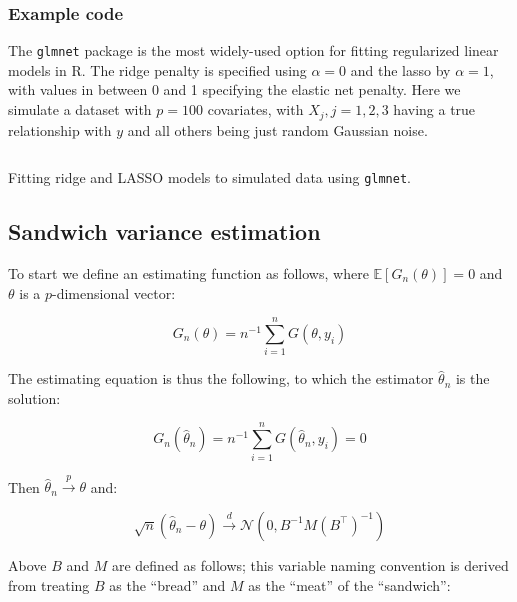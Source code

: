 \documentclass{report}
\begin{document}
\subsubsection{Example code}

The \texttt{glmnet} package is the most widely-used option for fitting regularized linear models in R. The ridge penalty is specified using $\alpha = 0$ and the \gls{lasso} by $\alpha = 1$, with values in between 0 and 1 specifying the elastic net penalty. Here we simulate a dataset with $p = 100$ covariates, with $X_j, j = 1, 2, 3$ having a true relationship with $y$ and all others being just random Gaussian noise. 

\begin{listing}[h!]
\inputminted{r}{Example-Code/ridge_and_lasso_gaussian.R}
\caption{Fitting ridge and LASSO models to simulated data using \texttt{glmnet}.}
\label{listing:glmnet-example}
\end{listing}

\subsection{Sandwich variance estimation}

To start we define an estimating function as follows, where $\mathbb{E}[G_n(\theta)] = 0$ and $\theta$ is a $p$-dimensional vector:

\begin{equation}\label{eq:ols-sandwich-est-function}
    G_n(\theta) = n^{-1} \sum_{i=1}^n G(\theta, y_i)
\end{equation}

The estimating equation is thus the following, to which the estimator $\hat{\theta}_n$ is the solution:

\begin{equation}\label{eq:ols-sandwich-est-equation}
    G_n\left(\hat{\theta}_n\right) = n^{-1} \sum_{i=1}^n G\left(\hat{\theta}_n, y_i\right) = 0
\end{equation}

Then $\hat{\theta}_n \overset{p}{\to} \theta$ and:

\begin{equation}\label{eq:ols-sandwich-asymptotic-dist}
    \sqrt{n}\left(\hat{\theta}_n - \theta\right) \overset{d}{\to} \mathcal{N}\left(0, B^{-1}M\left(B^\intercal\right)^{-1}\right)
\end{equation}

Above $B$ and $M$ are defined as follows; this variable naming convention is derived from treating $B$ as the ``bread'' and $M$ as the ``meat'' of the ``sandwich'':
\end{document}
